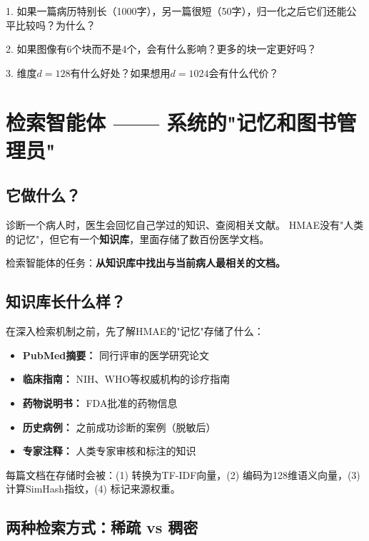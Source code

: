 \documentclass[11pt,a4paper]{ctexart}
\begin{document}
\begin{exerbox}[思考题]
1. 如果一篇病历特别长（1000字），另一篇很短（50字），归一化之后它们还能公平比较吗？为什么？

2. 如果图像有6个块而不是4个，会有什么影响？更多的块一定更好吗？

3. 维度$d=128$有什么好处？如果想用$d=1024$会有什么代价？
\end{exerbox}

\newpage

\section{检索智能体 —— 系统的"记忆和图书管理员"}

\subsection{它做什么？}

诊断一个病人时，医生会回忆自己学过的知识、查阅相关文献。
HMAE没有"人类的记忆"，但它有一个\textbf{知识库}，里面存储了数百份医学文档。

检索智能体的任务：\textbf{从知识库中找出与当前病人最相关的文档。}

\subsection{知识库长什么样？}

在深入检索机制之前，先了解HMAE的"记忆"存储了什么：

\begin{itemize}[nosep]
\item \textbf{PubMed摘要：} 同行评审的医学研究论文
\item \textbf{临床指南：} NIH、WHO等权威机构的诊疗指南
\item \textbf{药物说明书：} FDA批准的药物信息
\item \textbf{历史病例：} 之前成功诊断的案例（脱敏后）
\item \textbf{专家注释：} 人类专家审核和标注的知识
\end{itemize}

每篇文档在存储时会被：(1) 转换为TF-IDF向量，(2) 编码为128维语义向量，(3) 计算SimHash指纹，(4) 标记来源权重。

\subsection{两种检索方式：稀疏 vs 稠密}
\end{document}
